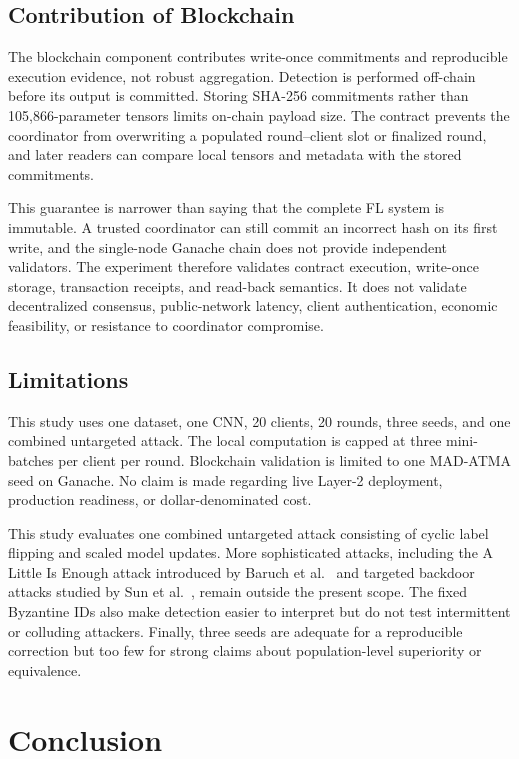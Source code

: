 \documentclass[10pt,letterpaper]{article}
\begin{document}
\subsection{Contribution of Blockchain}

The blockchain component contributes write-once commitments and reproducible
execution evidence, not robust aggregation. Detection is performed off-chain
before its output is committed. Storing SHA-256 commitments rather than
105,866-parameter tensors limits on-chain payload size. The contract prevents
the coordinator from overwriting a populated round--client slot or finalized
round, and later readers can compare local tensors and metadata with the stored
commitments.

This guarantee is narrower than saying that the complete FL system is
immutable. A trusted coordinator can still commit an incorrect hash on its
first write, and the single-node Ganache chain does not provide independent
validators. The experiment therefore validates contract execution, write-once
storage, transaction receipts, and read-back semantics. It does not validate
decentralized consensus, public-network latency, client authentication,
economic feasibility, or resistance to coordinator compromise.

\subsection{Limitations}

This study uses one dataset, one CNN, 20 clients, 20 rounds, three seeds, and
one combined untargeted attack. The local computation is capped at three
mini-batches per client per round. Blockchain validation is limited to one
MAD-ATMA seed on Ganache. No claim is made regarding live Layer-2 deployment,
production readiness, or dollar-denominated cost.

This study evaluates one combined untargeted attack consisting of cyclic label
flipping and scaled model updates. More sophisticated attacks, including the A
Little Is Enough attack introduced by Baruch et al.~\cite{baruch2019} and
targeted backdoor attacks studied by Sun et al.~\cite{sun2019}, remain outside
the present scope. The fixed Byzantine IDs also make detection easier to
interpret but do not test intermittent or colluding attackers. Finally, three
seeds are adequate for a reproducible correction but too few for strong claims
about population-level superiority or equivalence.

\section{Conclusion}
\end{document}

